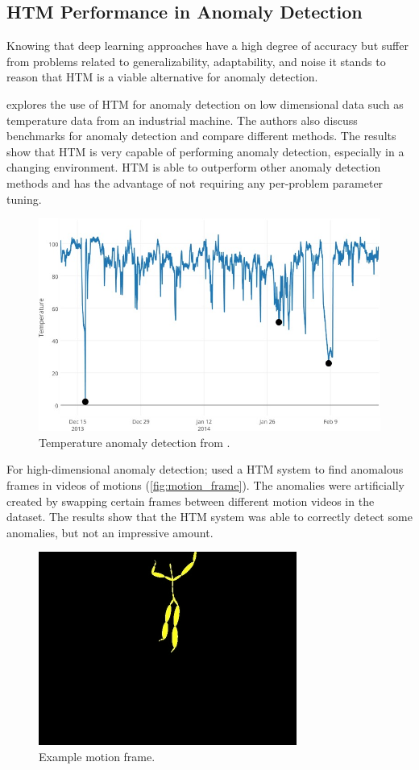 \subsection{HTM Performance in Anomaly Detection}
\label{sec:htm_perf}
Knowing that deep learning approaches have a high degree of accuracy but suffer from problems related to generalizability, adaptability, and noise it stands to reason that HTM is a viable alternative for anomaly detection.\par
\textcite{AHMAD2017134} explores the use of HTM for anomaly detection on low dimensional data such as temperature data from an industrial machine. The authors also discuss benchmarks for anomaly detection and compare different methods. The results show that HTM is very capable of performing anomaly detection, especially in a changing environment. HTM is able to outperform other anomaly detection methods and has the advantage of not requiring any per-problem parameter tuning.
\begin{figure}[H]
    \centering
    \includegraphics[width=0.75\linewidth]{resources/related_works/htm_anomaly_paper_example.jpg}
    \caption{Temperature anomaly detection from \textcite{AHMAD2017134}.}
\end{figure}
For high-dimensional anomaly detection; \textcite{MotionAnomalyDetection} used a HTM system to find anomalous frames in videos of motions (\autoref{fig:motion_frame}). The anomalies were artificially created by swapping certain frames between different motion videos in the dataset. The results show that the HTM system was able to correctly detect some anomalies, but not an impressive amount.
\begin{figure}[H]
    \centering
    \includegraphics[width=0.5\linewidth]{resources/related_works/motion_frame.png}
    \caption{Example motion frame\cite{MotionAnomalyDetection}.}
    \label{fig:motion_frame}
\end{figure}
